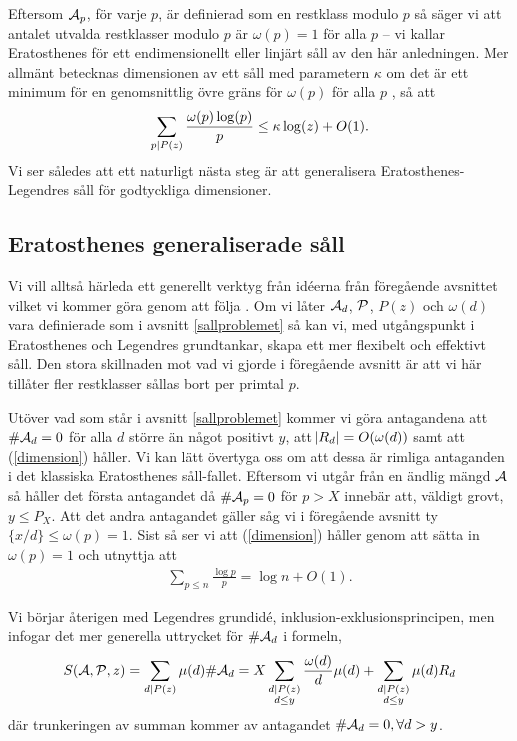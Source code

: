 Eftersom \(\A_p\), för varje $p$, är definierad som en restklass modulo $p$ så säger vi att antalet utvalda restklasser modulo $p$ är $\omega(p) = 1$ för alla $p$ -- vi kallar Eratosthenes för ett endimensionellt eller linjärt såll av den här anledningen. Mer allmänt betecknas dimensionen av ett såll med parametern \(\kappa\) om det är ett minimum för en genomsnittlig övre gräns för \(\omega(p)\) för alla $p$ \cite{tenenbaum}, så att
\begin{align} \label{dimension}
    \sum_{p \divides P(z)} \frac{\omega(p) \log(p)}{p} \leq \kappa \log(z) + O(1).
\end{align}
Vi ser således att ett naturligt nästa steg är att generalisera Eratosthenes-Legendres såll för godtyckliga dimensioner. 

\subsection{Eratosthenes generaliserade såll} \label{eratosthenes.gen.såll}
Vi vill alltså härleda ett generellt verktyg från idéerna från föregående avsnittet vilket vi kommer göra genom att följa \cite[Kapitel 5.4]{cojocarumurty}. Om vi låter $\A_d$, $\P$, $P(z)$ och $\omega(d)$ vara definierade som i avsnitt \ref{sallproblemet} så kan vi, med utgångspunkt i Eratosthenes och Legendres grundtankar, skapa ett mer flexibelt och effektivt såll. Den stora skillnaden mot vad vi gjorde i föregående avsnitt är att vi här tillåter fler restklasser sållas bort per primtal $p$. 

Utöver vad som står i avsnitt \ref{sallproblemet} kommer vi göra antagandena att \(\card{\A_d} = 0\) för alla \(d\) större än något positivt $y$, att \(\abs{R_d} = O(\omega(d))\) samt att (\ref{dimension}) håller. Vi kan lätt övertyga oss om att dessa är rimliga antaganden i det klassiska Eratosthenes såll-fallet. Eftersom vi utgår från en ändlig mängd $\A$ så håller det första antagandet då \(\card{\A_p} = 0\) för \(p > X\) innebär att, väldigt grovt, \(y \leq P_{X}\). Att det andra antagandet gäller såg vi i föregående avsnitt ty \(\{x/d\} \leq \omega(p) = 1\). Sist så ser vi att (\ref{dimension}) håller genom att sätta in \(\omega(p) = 1\) och utnyttja att \begin{align} \label{Thm.1.4.4}
    \sum_{p\leq n}\frac{\log p}{p} = \log n + O(1).
\end{align}

Vi börjar återigen med Legendres grundidé, inklusion-exklusionsprincipen, men infogar det mer generella uttrycket för $\card{\A_d}$ i formeln,
\begin{align*}
    \S{A}{P}{z} = \sum_{d \divides P(z)} \mu(d) \card{\A_d} = X \sum_{\substack{d \divides P(z) \\ d \leq y}} \frac{\omega(d)}{d} \mu(d) + \sum_{\substack{d \divides P(z)  \\ d \leq y}} \mu(d) R_d 
\end{align*}
där trunkeringen av summan kommer av antagandet \(\card{\A_d} = 0, \forall d > y\). 

